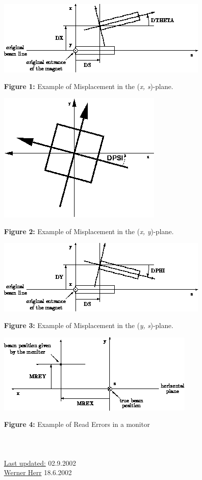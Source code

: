 \includegraphics{figures/xs_align.png}

\textbf{Figure 1:} Example of Misplacement in the (\textit{x, s})-plane. 

\includegraphics{error/dpsi.png}

\textbf{Figure 2:} Example of Misplacement in the (\textit{x, y})-plane. 

\includegraphics{figures/ys_align.png}

\textbf{Figure 3:} Example of Misplacement in the (\textit{y, s})-plane. 

\includegraphics{figures/monitor_read.png}

\textbf{Figure 4:} Example of Read Errors in a monitor 
\\
\\
\\
\\\href{http://consult.cern.ch/xwho/people/1808}{Last updated:} 02.9.2002 \\\href{http://consult.cern.ch/xwho/people/1808}{Werner Herr} 18.6.2002 

